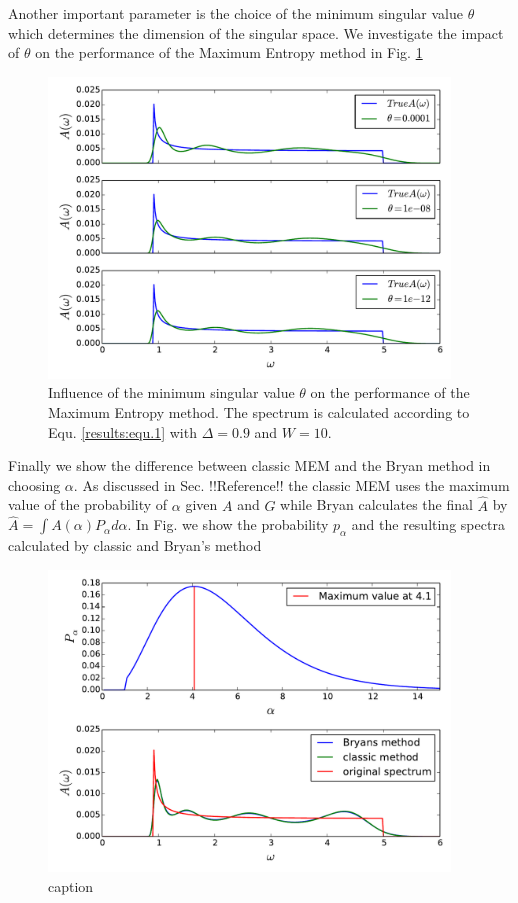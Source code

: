 \FloatBarrier
Another important parameter is the choice of the minimum singular value $\theta$ which determines the dimension of the singular space. We investigate the impact of $\theta$ on the performance of the Maximum Entropy method in Fig. \ref{results:fig.3}
\begin{figure}[htbp]
	\centering
	\includegraphics[width=0.95\textwidth]{./images/BCS_varying_cutoffs.pdf}
	\caption{Influence of the minimum singular value $\theta$ on the performance of the Maximum Entropy method. The spectrum is calculated according to Equ. \ref{results:equ.1} with $\Delta = 0.9$ and $W = 10$.}
	\label{results:fig.3}
\end{figure}
\FloatBarrier
Finally we show the difference between classic MEM and the Bryan method in choosing $\alpha$. As discussed in Sec. !!Reference!! the classic MEM uses the maximum value of the probability of $\alpha$ given $A$ and $G$ while Bryan calculates the final $\hat{A}$ by  $\hat{A} = \int A(\alpha) P_{\alpha} d\alpha$. In Fig. we show the probability $p_{\alpha}$ and the resulting spectra calculated by classic and Bryan's method
\begin{figure}[htbp]
	\centering
	\includegraphics[width=0.95\textwidth]{./images/BCS_Bryan_classic_p_alpha.pdf}
	\caption{caption}
	\label{results:fig.4}
\end{figure}
\FloatBarrier
